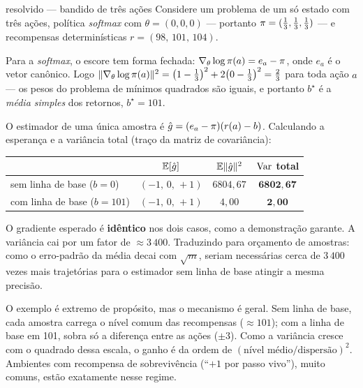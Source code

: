 \documentclass[11pt, a4paper]{article}
\newcommand{\ghat}{\hat{g}}
\begin{document}
\begin{exbox}{resolvido — bandido de três ações}
Considere um problema de um só estado com três ações, política \emph{softmax}
com $\theta = (0,0,0)$ --- portanto $\pi = (\tfrac13,\tfrac13,\tfrac13)$ --- e
recompensas determinísticas $r = (98,\, 101,\, 104)$.

\smallskip
Para a \emph{softmax}, o escore tem forma fechada:
$\nabla_\theta \log \pi(a) = e_a - \pi$, onde $e_a$ é o vetor canônico. Logo
$\lVert\nabla_\theta \log\pi(a)\rVert^2 = \big(1-\tfrac13\big)^2 + 2\big(0-\tfrac13\big)^2 = \tfrac23$ para toda ação
$a$ --- os pesos do problema de mínimos quadrados são iguais, e portanto
$b^\star$ é a \emph{média simples} dos retornos, $b^\star = 101$.

\smallskip
O estimador de uma única amostra é $\ghat = (e_a - \pol)(r(a) - b)$. Calculando
a esperança e a variância total (traço da matriz de covariância):

\medskip
\begin{center}
\begin{tabular}{@{}lccc@{}}
\toprule
 & $\E[\ghat]$ & $\E\norm{\ghat}^2$ & $\operatorname{Var}$ total \\
\midrule
sem linha de base ($b=0$)     & $(-1,\,0,\,+1)$ & $6804{,}67$ & $\mathbf{6802{,}67}$ \\
com linha de base ($b=101$)   & $(-1,\,0,\,+1)$ & $4{,}00$    & $\mathbf{2{,}00}$ \\
\bottomrule
\end{tabular}
\end{center}
\vspace{-0.3em}
O gradiente esperado é \textbf{idêntico} nos dois casos, como a demonstração
garante. A variância cai por um fator de $\approx 3\,400$. Traduzindo para
orçamento de amostras: como o erro-padrão da média decai com $\sqrt{m}$, seriam
necessárias cerca de $3\,400$ vezes mais trajetórias para o estimador sem linha
de base atingir a mesma precisão.
\end{exbox}

\begin{ideiabox}
O exemplo é extremo de propósito, mas o mecanismo é geral. Sem linha de base,
cada amostra carrega o nível comum das recompensas ($\approx 101$); com a linha de
base em 101, sobra só a diferença entre as ações ($\pm 3$). Como a variância
cresce com o quadrado dessa escala, o ganho é da ordem de
$(\text{nível médio}/\text{dispersão})^2$. Ambientes com
recompensa de sobrevivência (``$+1$ por passo vivo''), muito comuns, estão
exatamente nesse regime.
\end{ideiabox}
\end{document}
